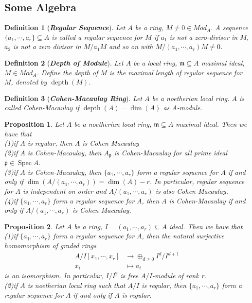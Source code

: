 \documentclass{ctexart}
\newtheorem{definition}{Definition}[section]
\newtheorem{proposition}{Proposition}[section]
\newcommand{\depth}{\operatorname{depth}}
\newcommand{\spec}{\operatorname{Spec}}
\begin{document}
\subsection{Some Algebra}
\begin{definition}[\textbf{\emph{Regular Sequence}}]
    Let $A$ be a ring, $M \neq 0\in Mod_{A}$.
    A sequence $\{a_{1}, \cdots, a_{r}\} \subseteq A$ is called a regular sequence for $M$ if $a_{1}$ is not a zero-divisor in $M$, $a_{2}$ is not a zero divisor in $M/a_{1}M$ and so on with $M/(a_{1}, \cdots, a_{r})M \neq 0$.
\end{definition}
\begin{definition}[\textbf{\emph{Depth of Module}}]
    Let $A$ be a local ring, $\mathfrak{m} \subseteq A$ maximal ideal, $M\in Mod_{A}$.
    Define the depth of $M$ is the maximal length of regular sequence for $M$, denoted by $\depth(M)$.
\end{definition}
\begin{definition}[\textbf{\emph{Cohen-Macaulay Ring}}]
    Let $A$ be a noetherian local ring.
    $A$ is called Cohen-Macaulay if $\depth(A) = \dim(A)$ as $A$-module.
\end{definition}
\begin{proposition}
    Let $A$ be a noetherian local ring, $\mathfrak{m} \subseteq A$ maximal ideal.
    Then we have that \\
    (1)if $A$ is regular, then $A$ is Cohen-Macaulay \\
    (2)if $A$ is Cohen-Macaulay, then $A_{\mathfrak{p}}$ is Cohen-Macaulay for all prime ideal $\mathfrak{p}\in \spec A$. \\
    (3)if $A$ is Cohen-Macaulay, then $\{a_{1}, \cdots, a_{r}\}$ form a regular sequence for $A$ if and only if $\dim(A/(a_{1}, \cdots, a_{r})) = \dim(A) - r$.
    In particular, regular sequence for $A$ is independent on order and $A/(a_{1}, \cdots, a_{r})$ is also Cohen-Macaulay. \\
    (4)if $\{a_{1}, \cdots, a_{r}\}$ form a regular sequence for $A$, then $A$ is Cohen-Macaulay if and only if $A/(a_{1}, \cdots, a_{r})$ is Cohen-Macaulay.
    \label{Proposition 11.10}
\end{proposition}
\begin{proposition}
    Let $A$ be a ring, $I = (a_{1}, \cdots, a_{r}) \subseteq A$ ideal.
    Then we have that \\
    (1)if $\{a_{1}, \cdots, a_{r}\}$ form a regular sequence for $A$, 
    then the natural surjective homomorphism of graded rings 
    \begin{equation*}
        \begin{split}
            A/I[x_{1}, \cdots, x_{r}] & \longrightarrow \oplus_{d \ge 0} I^{d}/I^{d + 1} \\
            x_{i} & \longmapsto a_{i}
        \end{split}
    \end{equation*}
    is an isomorphism. 
    In particular, $I/I^{2}$ is free $A/I$-module of rank r. \\
    (2)if $A$ is noetherian local ring such that $A/I$ is regular,
    then $\{a_{1}, \cdots, a_{r}\}$ form a regular sequence for $A$ if and only if $A$ is regular.
    \label{Proposition 11.11}
\end{proposition}
\end{document}
